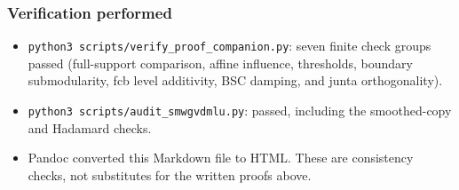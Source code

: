 \subsubsection{Verification performed}\label{verification-performed}

\begin{itemize}
\tightlist
\item
  \texttt{python3\ scripts/verify\_proof\_companion.py}: seven finite check groups passed (full-support comparison, affine influence, thresholds, boundary submodularity, fcb level additivity, BSC damping, and junta orthogonality).
\item
  \texttt{python3\ scripts/audit\_smwgvdmlu.py}: passed, including the smoothed-copy and Hadamard checks.
\item
  Pandoc converted this Markdown file to HTML. These are consistency checks, not substitutes for the written proofs above.
\end{itemize}
